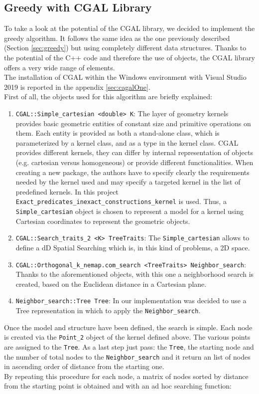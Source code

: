 \subsection{Greedy with CGAL Library}
To take a look at the potential of the CGAL library, we decided to implement the greedy algorithm. It follows the same idea as the one previously described (Section \ref{sec:greedy}) but using completely different data structures. Thanks to the potential of the C++ code and therefore the use of objects, the CGAL library offers a very wide range of elements.\\ 
The installation of CGAL within the Windows environment with Visual Studio 2019 is reported in the appendix \ref{sec:cagalOne}.\\
First of all, the objects used for this algorithm are briefly explained:
\begin{enumerate}
\item \texttt{CGAL::Simple\_cartesian <double> K}: The layer of geometry kernels provides basic geometric entities of constant size and primitive operations on them. Each entity is provided as both a stand-alone class, which is parameterized by a kernel class, and as a type in the kernel class. CGAL provides different kernels, they can differ by internal representation of objects (e.g. cartesian versus homogeneous) or provide different functionalities. When creating a new package, the authors have to specify clearly the requirements needed by the kernel used and may specify a targeted kernel in the list of predefined kernels. In this project \texttt{Exact\_predicates\_inexact\_constructions\_kernel} is used. Thus, a \texttt{Simple\_cartesian} object is chosen to represent a model for a kernel using Cartesian coordinates to represent the geometric objects.
\item \texttt{CGAL::Search\_traits\_2 <K> TreeTraits}: The \texttt{Simple\_cartesian} allows to define a dD Spatial Searching which is, in this kind of problems, a 2D space.
\item \texttt{CGAL::Orthogonal\_k\_nemap.com\_search <TreeTraits> Neighbor\_search}: Thanks to the aforementioned objects, with this one a neighborhood search is created, based on the Euclidean distance in a Cartesian plane.
\item \texttt{Neighbor\_search::Tree Tree}: In our implementation was decided to use a Tree representation in which to apply the \texttt{Neighbor\_search}.
\end{enumerate}
Once the model and structure have been defined, the search is simple. Each node is created via the \texttt{Point\_2} object of the kernel defined above. The various points are assigned to the \texttt{Tree}. As a last step just pass: the \texttt{Tree}, the starting node and the number of total nodes to the \texttt{Neighbor\_search} and it return an list of nodes in ascending order of distance from the starting one.\\
By repeating this procedure for each node, a matrix of nodes sorted by distance from the starting point is obtained and with an ad hoc searching function:

